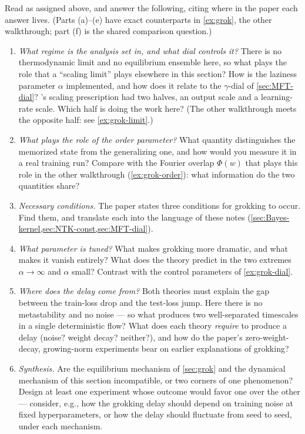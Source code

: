 \documentclass[11pt]{article}
\begin{document}
\begin{exercise}
\label{ex:grok-lazy}
Read \cite{kumar2024grokking} as assigned above, and answer the following, citing where in the paper each answer lives. (Parts (a)--(e) have exact counterparts in \cref{ex:grok}, the other walkthrough; part (f) is the shared comparison question.)
\begin{enumerate}
    \item \emph{What regime is the analysis set in, and what dial controls it?} There is no thermodynamic limit and no equilibrium ensemble here, so what plays the role that a ``scaling limit'' plays elsewhere in this section? How is the laziness parameter $\alpha$ implemented, and how does it relate to the $\gamma$-dial of \cref{sec:MFT-dial}? 's scaling prescription had two halves, an output scale and a learning-rate scale. Which half is doing the work here? (The other walkthrough meets the opposite half: see \cref{ex:grok-limit}.)
    \item \emph{What plays the role of the order parameter?} What quantity distinguishes the memorized state from the generalizing one, and how would you measure it in a real training run? Compare with the Fourier overlap $\Phi(w)$ that plays this role in the other walkthrough (\cref{ex:grok-order}): what information do the two quantities share?
    \item \emph{Necessary conditions.} The paper states three conditions for grokking to occur. Find them, and translate each into the language of these notes (\cref{sec:Bayes-kernel,sec:NTK-const,sec:MFT-dial}).
    \item \emph{What parameter is tuned?} What makes grokking more dramatic, and what makes it vanish entirely? What does the theory predict in the two extremes $\alpha\to\infty$ and $\alpha$ small? Contrast with the control parameters of \cref{ex:grok-dial}.
    \item \emph{Where does the delay come from?} Both theories must explain the gap between the train-loss drop and the test-loss jump. Here there is no metastability and no noise --- so what produces two well-separated timescales in a single deterministic flow? What does each theory \emph{require} to produce a delay (noise? weight decay? neither?), and how do the paper's zero-weight-decay, growing-norm experiments bear on earlier explanations of grokking?
    \item\label{ex:grok-lazy-synthesis} \emph{Synthesis.} Are the equilibrium mechanism of \cref{sec:grok} and the dynamical mechanism of this section incompatible, or two corners of one phenomenon? Design at least one experiment whose outcome would favor one over the other --- consider, e.g., how the grokking delay should depend on training noise at fixed hyperparameters, or how the delay should fluctuate from seed to seed, under each mechanism.
\end{enumerate}
\end{exercise}
\end{document}
